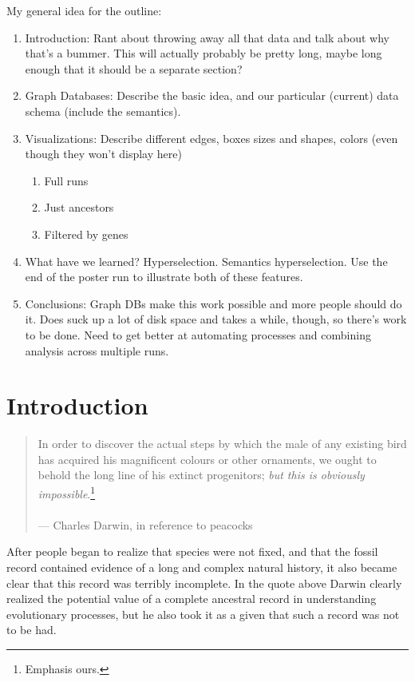 My general idea for the outline:
\begin{enumerate}
	\item Introduction: Rant about throwing away all that data and talk about why that's a bummer. This will actually probably be pretty long, maybe long enough that it should be a separate section?
	\item Graph Databases: Describe the basic idea, and our particular (current) data schema (include the semantics).
	\item Visualizations: Describe different edges, boxes sizes and shapes, colors (even though they won't display here)
	\begin{enumerate}
		\item Full runs
		\item Just ancestors
		\item Filtered by genes
	\end{enumerate}
	\item What have we learned? Hyperselection. Semantics hyperselection. Use the end of the poster run to illustrate both of these features.
	\item Conclusions: Graph DBs make this work possible and more people should do it. Does suck up a lot of disk space and takes a while, though, so there's work to be done. Need to get better at automating processes and combining analysis across multiple runs.
\end{enumerate}

\section{Introduction}
\label{sec:intro}

\begin{quote}
	In order to discover the actual steps by which the male of any existing 
	bird has acquired his magnificent colours or other ornaments, we ought 
	to behold the long line of his extinct progenitors; \emph{but this is obviously impossible}.\footnote{Emphasis ours.} \\
	\\
	--- Charles Darwin, in reference to peacocks~\cite{Darwin} 
\end{quote}

After people began to realize that species were not fixed, and that the fossil 
record contained evidence of a long and complex natural history, it also
became clear that this record was terribly incomplete. In the quote above
Darwin clearly realized the potential value of a complete ancestral record in
understanding evolutionary processes, but he also took it as a given that
such a record was not to be had.

